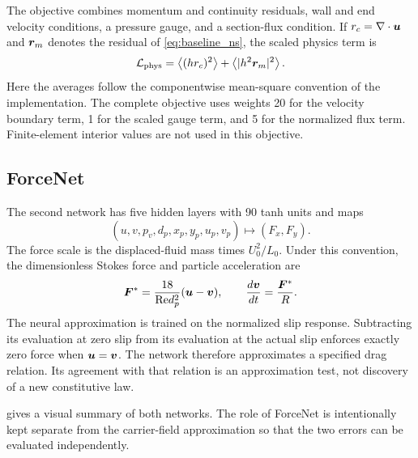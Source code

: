 The objective combines momentum and continuity residuals, wall and end
velocity conditions, a pressure gauge, and a section-flux condition. If
$r_c=\nabla\cdot\bm{u}$ and $\bm{r}_m$ denotes the residual of
\cref{eq:baseline_ns}, the scaled physics term is
\begin{equation}
 \mathcal{L}_{\mathrm{phys}}
 =\left\langle (hr_c)^2\right\rangle
 +\left\langle |h^2\bm{r}_m|^2\right\rangle.
 \label{eq:baseline_loss}
\end{equation}
Here the averages follow the componentwise mean-square convention of the
implementation. The complete objective uses weights 20 for the velocity
boundary term, 1 for the scaled gauge term, and 5 for the normalized flux
term. Finite-element interior values are not used in this objective.

\subsection{ForceNet}
The second network has five hidden layers with 90 tanh units and maps
\begin{equation}
 (u,v,p_v,d_p,x_p,y_p,u_p,v_p)\longmapsto(F_x,F_y).
 \label{eq:forcenet}
\end{equation}
The force scale is the displaced-fluid mass times $U_0^2/L_0$. Under this
convention, the dimensionless Stokes force and particle acceleration are
\begin{equation}
 \bm{F}^{*}=\frac{18}{\mathrm{Re} d_p^2}
 (\bm{u}-\bm{v}),\qquad
 \frac{d\bm{v}}{dt}=\frac{\bm{F}^{*}}{R}.
 \label{eq:force_scaling}
\end{equation}
The neural approximation is trained on the normalized slip response.
Subtracting its evaluation at zero slip from its evaluation at the actual
slip enforces exactly zero force when $\bm{u}=\bm{v}$. The network
therefore approximates a specified drag relation. Its agreement with that
relation is an approximation test, not discovery of a new constitutive law.

 gives a visual summary of both networks.
The role of ForceNet is intentionally kept separate from the carrier-field
approximation so that the two errors can be evaluated independently.



